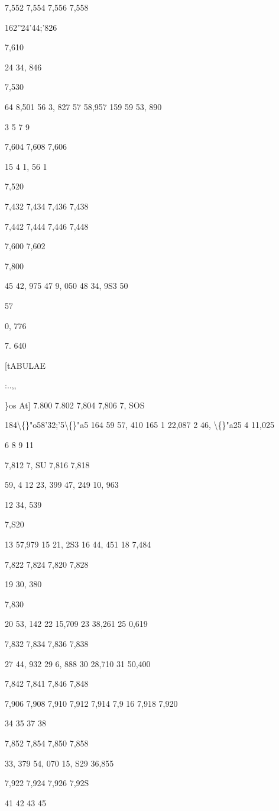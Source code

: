 \documentclass[10pt,a4paper]{article}
\begin{document}
7,552
7,554
7,556
7,558

162''24'44;'826

7,610

24 34, 846

7,530

64 8,501
56 3, 827
57 58,957
159 59 53, 890

3
5
7
9

7,604
7,608
7,606

15 4 1, 56 1

7,520

7,432
7,434
7,436
7,438

7,442
7,444
7,446
7,448

7,600
7,602

7,800

45 42, 975
47 9, 050
48 34, 9S3
50

57

0, 776

7. 640

\newpage

[tABULAE

:..,,

\}os At]
7.800
7.802
7,804
7,806
7, SOS

184\textbackslash\{\}"o58'32;'5\textbackslash\{\}"a5
164 59 57, 410
165 1 22,087
2 46, \textbackslash\{\}"a25
4 11,025

6
8
9
11

7,812
7, SU
7,816
7,818

59, 4 12
23, 399
47, 249
10, 963

12 34, 539

7,S20

13 57,979
15 21, 2S3
16 44, 451
18 7,484

7,822
7,824
7,820
7,828

19 30, 380

7,830

20 53, 142
22 15,709
23 38,261
25 0,619

7,832
7,834
7,836
7,838

27 44, 932
29 6, 888
30 28,710
31 50,400

7,842
7,841
7,846
7,848

7,906
7,908
7,910
7,912
7,914
7,9 16
7,918
7,920

34
35
37
38

7,852
7,854
7,850
7,858

33, 379
54, 070
15, S29
36,855

7,922
7,924
7,926
7,92S

41
42
43
45
\end{document}
